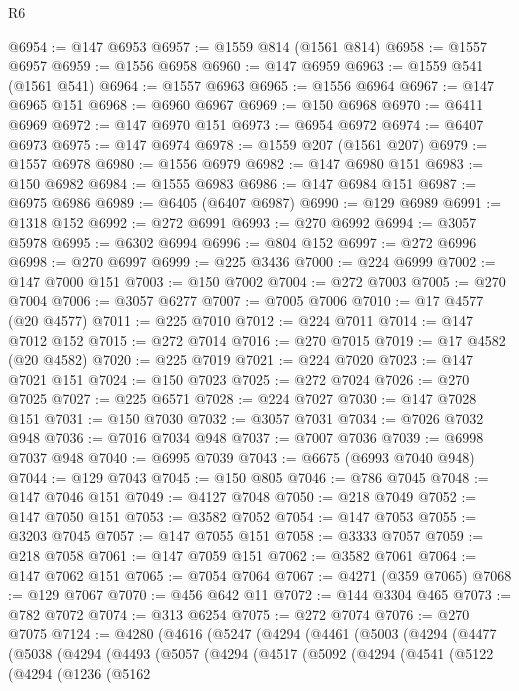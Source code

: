 \begin{lexlean}{R6}
\begin{coremodule}
@6954 := @147 @6953
@6957 := @1559 @814 (@1561 @814)
@6958 := @1557 @6957
@6959 := @1556 @6958
@6960 := @147 @6959
@6963 := @1559 @541 (@1561 @541)
@6964 := @1557 @6963
@6965 := @1556 @6964
@6967 := @147 @6965 @151
@6968 := @6960 @6967
@6969 := @150 @6968
@6970 := @6411 @6969
@6972 := @147 @6970 @151
@6973 := @6954 @6972
@6974 := @6407 @6973
@6975 := @147 @6974
@6978 := @1559 @207 (@1561 @207)
@6979 := @1557 @6978
@6980 := @1556 @6979
@6982 := @147 @6980 @151
@6983 := @150 @6982
@6984 := @1555 @6983
@6986 := @147 @6984 @151
@6987 := @6975 @6986
@6989 := @6405 (@6407 @6987)
@6990 := @129 @6989
@6991 := @1318 @152
@6992 := @272 @6991
@6993 := @270 @6992
@6994 := @3057 @5978
@6995 := @6302 @6994
@6996 := @804 @152
@6997 := @272 @6996
@6998 := @270 @6997
@6999 := @225 @3436
@7000 := @224 @6999
@7002 := @147 @7000 @151
@7003 := @150 @7002
@7004 := @272 @7003
@7005 := @270 @7004
@7006 := @3057 @6277
@7007 := @7005 @7006
@7010 := @17 @4577 (@20 @4577)
@7011 := @225 @7010
@7012 := @224 @7011
@7014 := @147 @7012 @152
@7015 := @272 @7014
@7016 := @270 @7015
@7019 := @17 @4582 (@20 @4582)
@7020 := @225 @7019
@7021 := @224 @7020
@7023 := @147 @7021 @151
@7024 := @150 @7023
@7025 := @272 @7024
@7026 := @270 @7025
@7027 := @225 @6571
@7028 := @224 @7027
@7030 := @147 @7028 @151
@7031 := @150 @7030
@7032 := @3057 @7031
@7034 := @7026 @7032 @948
@7036 := @7016 @7034 @948
@7037 := @7007 @7036
@7039 := @6998 @7037 @948
@7040 := @6995 @7039
@7043 := @6675 (@6993 @7040 @948)
@7044 := @129 @7043
@7045 := @150 @805
@7046 := @786 @7045
@7048 := @147 @7046 @151
@7049 := @4127 @7048
@7050 := @218 @7049
@7052 := @147 @7050 @151
@7053 := @3582 @7052
@7054 := @147 @7053
@7055 := @3203 @7045
@7057 := @147 @7055 @151
@7058 := @3333 @7057
@7059 := @218 @7058
@7061 := @147 @7059 @151
@7062 := @3582 @7061
@7064 := @147 @7062 @151
@7065 := @7054 @7064
@7067 := @4271 (@359 @7065)
@7068 := @129 @7067
@7070 := @456 @642 @11
@7072 := @144 @3304 @465
@7073 := @782 @7072
@7074 := @313 @6254
@7075 := @272 @7074
@7076 := @270 @7075
@7124 := @4280
    (@4616
      (@5247
        (@4294
          (@4461
            (@5003
              (@4294
                (@4477
                  (@5038
                    (@4294
                      (@4493
                        (@5057
                          (@4294
                            (@4517
                              (@5092
                                (@4294
                                  (@4541
                                    (@5122
                                      (@4294
                                        (@1236
                                          (@5162

\end{coremodule}
\end{lexlean}
